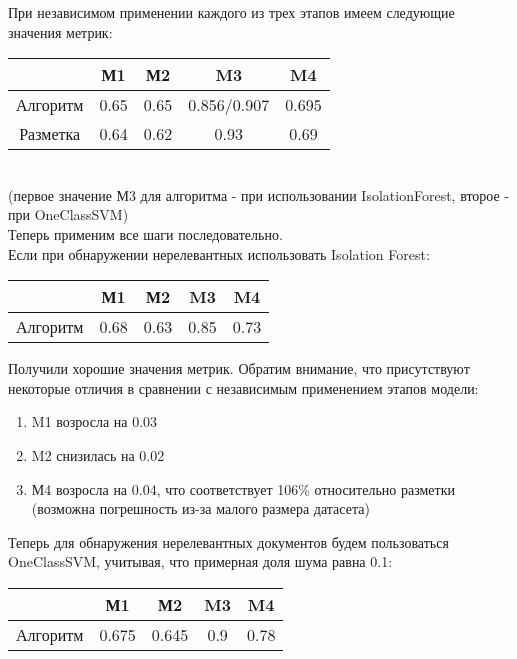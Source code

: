 \documentclass{article}
\begin{document}
При независимом применении каждого из трех этапов имеем следующие значения метрик:
\begin{table}[!htb]
\center
    \begin{tabular}{|c|c|c|c|c|}
    \hline
             & М1   & М2   & M3          & M4    \\ \hline
    Алгоритм & 0.65 & 0.65 & 0.856/0.907 & 0.695 \\ \hline
    Разметка & 0.64 & 0.62 & 0.93        & 0.69  \\ \hline
    \end{tabular}
\end{table}\\
(первое значение М3 для алгоритма - при использовании IsolationForest, второе - при OneClassSVM)\\

Теперь применим все шаги последовательно.\\

Если при обнаружении нерелевантных использовать Isolation Forest:
\begin{table}[!htb]
\center
    \begin{tabular}{|c|c|c|c|c|}
    \hline
             & М1   & М2   & M3   & M4   \\ \hline
    Алгоритм & 0.68 & 0.63 & 0.85 & 0.73 \\ \hline
    \end{tabular}
\end{table}

Получили хорошие значения метрик. Обратим внимание, что присутствуют некоторые отличия в сравнении с независимым применением этапов модели:
\begin{enumerate}
    \item M1 возросла на 0.03
    \item M2 снизилась на 0.02
    \item М4 возросла на 0.04, что соответствует 106\% относительно разметки (возможна погрешность из-за малого размера датасета)
\end{enumerate}

Теперь для обнаружения нерелевантных документов будем пользоваться OneClassSVM, учитывая, что примерная доля шума равна 0.1:
\begin{table}[!htb]
\center
    \begin{tabular}{|c|c|c|c|c|}
    \hline
             & М1   & М2   & M3   & M4   \\ \hline
    Алгоритм & 0.675 & 0.645 & 0.9 & 0.78 \\ \hline
    \end{tabular}
\end{table}
\end{document}
